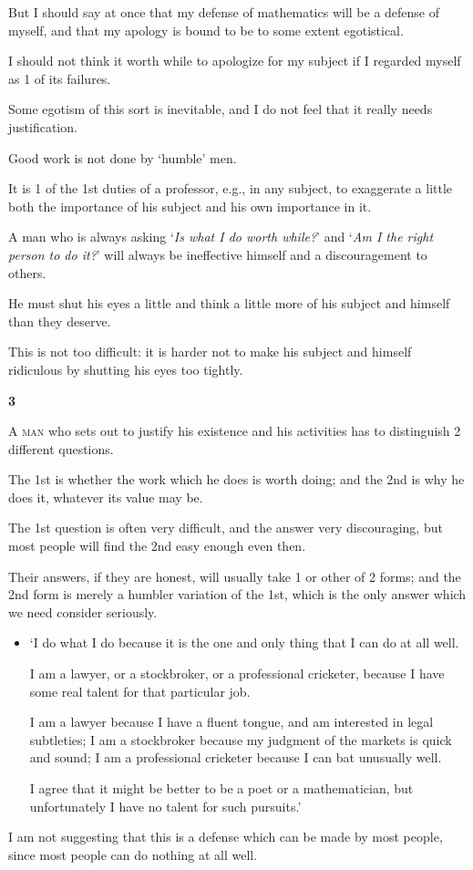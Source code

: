 \documentclass{article}
\numberwithin{equation}{section}
\begin{document}
But I should say at once that my defense of mathematics will be a defense of myself, and that my apology is bound to be to some extent egotistical.

I should not think it worth while to apologize for my subject if I regarded myself as 1 of its failures.

%
Some egotism of this sort is inevitable, and I do not feel that it really needs justification.

Good work is not done by `humble' men.

It is 1 of the 1st duties of a professor, e.g., in any subject, to exaggerate a little both the importance of his subject and his own importance in it.

A man who is always asking `\textit{Is what I do worth while?}' and `\textit{Am I the right person to do it?}' will always be ineffective himself and a discouragement to others.

He must shut his eyes a little and think a little more of his subject and himself than they deserve.

This is not too difficult: it is harder not to make his subject and himself ridiculous by shutting his eyes too tightly.

\begin{center}
    \large\textbf{3}
\end{center}
\textsc{A man} who sets out to justify his existence and his activities has to distinguish 2 different questions.

The 1st is whether the work which he does is worth doing; and the 2nd is why he does it, whatever its value may be.

The 1st question is often very difficult, and the answer very discouraging, but most people will find the 2nd easy enough even then.

Their answers, if they are honest, will usually take 1 or other of 2 forms; and the 2nd form is merely a humbler variation of the 1st, which is the only answer which we need consider seriously.
\begin{itemize}
    \item[(1)] `I do what I do because it is the one and only thing that I can do at all well.
    
    I am a lawyer, or a stockbroker, or a professional cricketer, because I have some real talent for that particular job.
    
    I am a lawyer because I have a fluent tongue, and am interested in legal subtleties; I am a stockbroker because my judgment of the markets is quick and sound; I am a professional cricketer because I can bat unusually well.
    
    I agree that it might be better to be a poet or a mathematician, but unfortunately I have no talent for such pursuits.'
\end{itemize}
I am not suggesting that this is a defense which can be made by most people, since most people can do nothing at all well.
\end{document}
